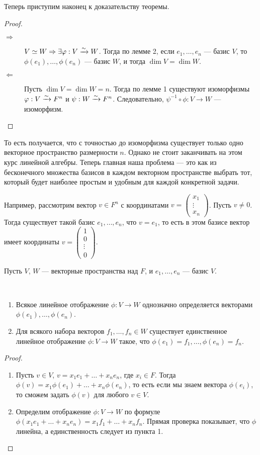 Теперь приступим наконец к доказательству теоремы.
\begin{proof} \ 
\begin{description}
\item[$\Rightarrow$] $V \simeq W \Rightarrow \exists \varphi: V \xrightarrow{\sim} W$. Тогда по лемме 2, если $e_1, \ldots, e_n$ --- базис $V$, то $\phi(e_1), \ldots, \phi(e_n)$ --- базис $W$, и тогда $\dim V = \dim W$.  
\item[$\Leftarrow$] Пусть $\dim V = \dim W = n$. Тогда по лемме 1 существуют изоморфизмы $\varphi: V \xrightarrow{\sim} F^n$ и $\psi : W \xrightarrow{\sim} F^n$. Следовательно, $\psi^{-1}\circ\phi: V \rightarrow W$ --- изоморфизм.
\end{description}
\end{proof}

То есть получается, что с точностью до изоморфизма существует только одно векторное пространство размерности $n$. Однако не стоит заканчивать на этом курс линейной алгебры. Теперь главная наша проблема --- это как из бесконечного множества базисов в каждом векторном пространстве выбрать тот, который будет наиболее простым и удобным для каждой конкретной задачи. 

Например, рассмотрим вектор $v \in F^n$ с координатами $v = \begin{pmatrix*}x_1 \\ \vdots \\ x_n\end{pmatrix*}$. Пусть $v \neq 0$. Тогда существует такой базис $e_1, \ldots, e_n$, что $v = e_1$, то есть в этом базисе вектор имеет координаты $v = \begin{pmatrix*}1 \\ 0\\ \vdots\\0\end{pmatrix*}$.

Пусть $V$, $W$ --- векторные пространства над $F$, и $e_1, \ldots, e_n$ --- базис $V$.
\begin{Suggestion} \ 
\begin{enumerate}
\item Всякое линейное отображение $\phi : V \rightarrow W$ однозначно определяется векторами $\phi(e_1), \ldots, \phi(e_n)$.
\item Для всякого набора векторов $f_1, \ldots, f_n \in W$ существует единственное линейное отображение $\phi: V \rightarrow W$ такое, что $\phi(e_1) = f_1, \ldots, \phi(e_n) = f_n$.
\end{enumerate}
\end{Suggestion}
\begin{proof} \ 
\begin{enumerate}
\item Пусть $v \in V$, $v = x_1 e_1 + \ldots + x_ne_n$, где $x_i \in F$. Тогда $\phi(v) = x_1\phi(e_1) + \ldots + x_n \phi(e_n)$, то есть если мы знаем  вектора $\phi(e_i)$, то сможем задать $\phi(v)$ для любого $v \in V$.
\item Определим отображение $\phi: V \rightarrow W$ по формуле $\phi(x_1 e_1 + \ldots + x_n e_n) = x_1f_1 + \ldots + x_nf_n$. Прямая проверка показывает, что $\phi$ линейна, а единственность следует из пункта 1.
\end{enumerate}
\end{proof}

